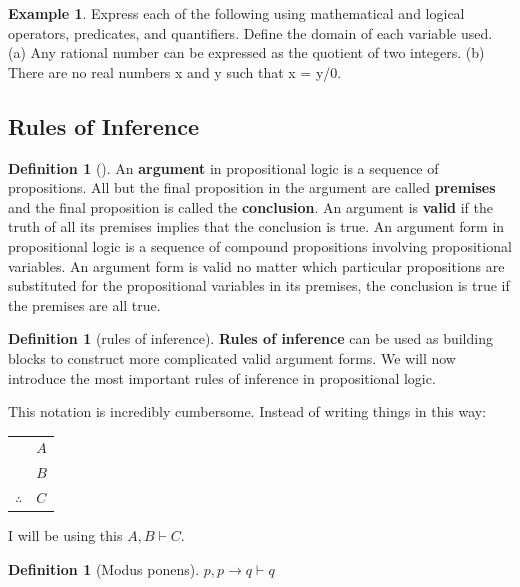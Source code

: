 \documentclass[letterpaper,10pt]{article}
\theoremstyle{plain}
\theoremstyle{definition}
\newtheorem{defn}[thm]{Definition}
\newtheorem{exmp}[thm]{Example}
\theoremstyle{remark}
\begin{document}
\begin{exmp}
Express each of the following using mathematical and logical operators,
predicates, and quantifiers. Define the domain of each variable used.
(a) Any rational number can be expressed as the quotient of two integers.
(b) There are no real numbers x and y such that x = y/0.

\end{exmp}
\vspace{3cm}

\newpage
\subsection{Rules of Inference}
\begin{defn}[]
An \textbf{argument} in propositional logic is a sequence of propositions. All but the final proposition
in the argument are called \textbf{premises} and the final proposition is called the \textbf{conclusion}. An
argument is \textbf{valid} if the truth of all its premises implies that the conclusion is true.
An argument form in propositional logic is a sequence of compound propositions involving
propositional variables. An argument form is valid no matter which particular propositions
are substituted for the propositional variables in its premises, the conclusion is true if
the premises are all true.
\end{defn}
\begin{defn}[rules of inference]
\textbf{Rules of inference} can be used as building blocks to construct more complicated valid argument forms.
We will now introduce the most important rules of inference in propositional logic.
\end{defn}
This notation is incredibly cumbersome. Instead of writing things in this way:
\begin{tabular}{cl}
    & $A$\\
    & $B$\\
    \hline
    $\therefore$ & $C$
  \end{tabular}
I will be using this
$A,B \vdash C$.

\begin{defn}[Modus ponens]
$p,p\to q \vdash q$
\end{defn}
\end{document}
